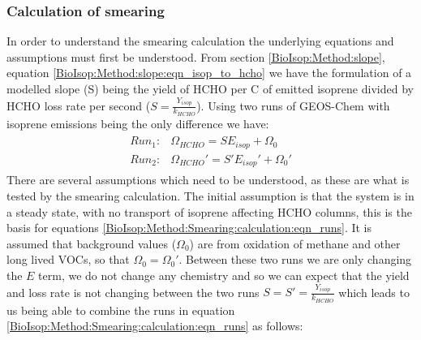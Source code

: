     
    
    \subsubsection{Calculation of smearing}
      \label{BioIsop:Method:Smearing:calculation}
      
      In order to understand the smearing calculation the underlying equations and assumptions must first be understood.
      From section \ref{BioIsop:Method:slope}, equation \ref{BioIsop:Method:slope:eqn_isop_to_hcho} we have the formulation of a modelled slope (S) being the yield of HCHO per C of emitted isoprene divided by HCHO loss rate per second ($S = \frac{Y_{isop}}{k_{HCHO}}$).
      Using two runs of GEOS-Chem with isoprene emissions being the only difference we have:
      \begin{eqnarray}
        \label{BioIsop:Method:Smearing:calculation:eqn_runs}
        \begin{split}
        Run_1 :&  \Omega_{HCHO} = S E_{isop} + \Omega_0 \\
        Run_2 :&  \Omega_{HCHO}' = S' E_{isop}' + \Omega_0' 
        \end{split}
      \end{eqnarray}
      There are several assumptions which need to be understood, as these are what is tested by the smearing calculation.
      The initial assumption is that the system is in a steady state, with no transport of isoprene affecting HCHO columns, this is the basis for equations \ref{BioIsop:Method:Smearing:calculation:eqn_runs}.
      It is assumed that background values ($\Omega_0$) are from oxidation of methane and other long lived VOCs, so that $\Omega_0 = \Omega_0'$.
      Between these two runs we are only changing the $E$ term, we do not change any chemistry and so we can expect that the yield and loss rate is not changing between the two runs $S = S' = \frac{Y_{isop}}{k_{HCHO}}$
      which leads to us being able to combine the runs in equation \ref{BioIsop:Method:Smearing:calculation:eqn_runs} as follows:
